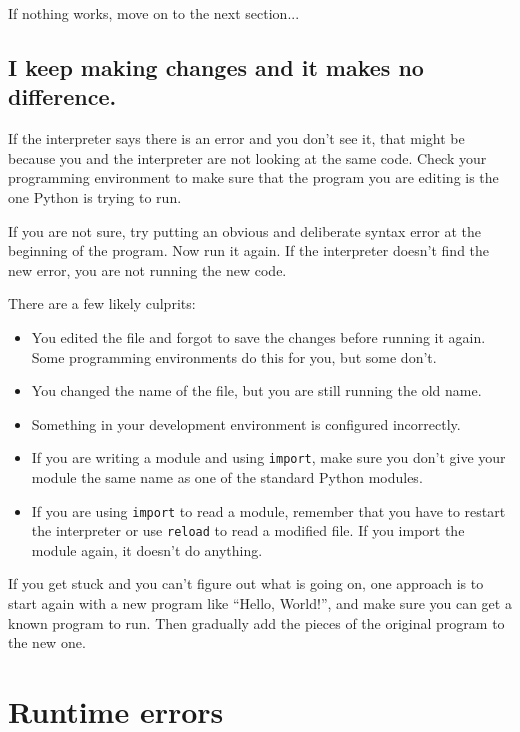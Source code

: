 \documentclass[10pt]{book}
\begin{document}
If nothing works, move on to the next section...


\subsection{I keep making changes and it makes no difference.}

If the interpreter says there is an error and you don't see it, that
might be because you and the interpreter are not looking at the same
code.  Check your programming environment to make sure that the
program you are editing is the one Python is trying to run.

If you are not sure, try putting an obvious and deliberate syntax
error at the beginning of the program.  Now run it again.  If the
interpreter doesn't find the new error, you are not running the
new code.

There are a few likely culprits:

\begin{itemize}

\item You edited the file and forgot to save the changes before
running it again.  Some programming environments do this
for you, but some don't.

\item You changed the name of the file, but you are still running
the old name.

\item Something in your development environment is configured
incorrectly.

\item If you are writing a module and using {\tt import},
make sure you don't give your module the same name as one
of the standard Python modules.

\item If you are using {\tt import} to read a module, remember
that you have to restart the interpreter or use {\tt reload}
to read a modified file.  If you import the module again, it
doesn't do anything.

\end{itemize}

If you get stuck and you can't figure out what is going on, one
approach is to start again with a new program like ``Hello, World!'',
and make sure you can get a known program to run.  Then gradually add
the pieces of the original program to the new one.


\section{Runtime errors}
\end{document}
